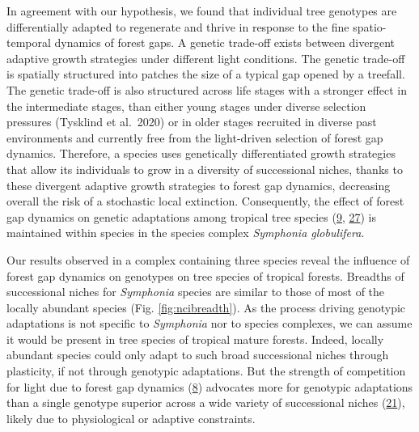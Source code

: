 \documentclass[
]{article}
\begin{document}
In agreement with our hypothesis, we found that individual tree genotypes are differentially adapted to regenerate and thrive in response to the fine spatio-temporal dynamics of forest gaps.
A genetic trade-off exists between divergent adaptive growth strategies under different light conditions.
The genetic trade-off is spatially structured into patches the size of a typical gap opened by a treefall.
The genetic trade-off is also structured across life stages with a stronger effect in the intermediate stages,
than either young stages under diverse selection pressures (Tysklind et al.~2020)
or in older stages recruited in diverse past environments and currently free from the light-driven selection of forest gap dynamics.
Therefore, a species uses genetically differentiated growth strategies that allow its individuals to grow in a diversity of successional niches,
thanks to these divergent adaptive growth strategies to forest gap dynamics,
decreasing overall the risk of a stochastic local extinction.
Consequently, the effect of forest gap dynamics on genetic adaptations among tropical tree species (\protect\hyperlink{ref-Herault2010}{9}, \protect\hyperlink{ref-Ruger2019}{27})
is maintained within species in the species complex \emph{Symphonia globulifera}.

Our results observed in a complex containing three species reveal the influence of forest gap dynamics on genotypes on tree species of tropical forests.
Breadths of successional niches for \emph{Symphonia} species are similar to those of most of the locally abundant species (Fig. \ref{fig:ncibreadth}).
As the process driving genotypic adaptations is not specific to \emph{Symphonia} nor to species complexes,
we can assume it would be present in tree species of tropical mature forests.
Indeed, locally abundant species could only adapt to such broad successional niches through plasticity,
if not through genotypic adaptations.
But the strength of competition for light due to forest gap dynamics (\protect\hyperlink{ref-VanBreugel2012}{8})
advocates more for genotypic adaptations than a single genotype superior across a wide variety of successional niches (\protect\hyperlink{ref-Ellner1994}{21}),
likely due to physiological or adaptive constraints.
\end{document}
